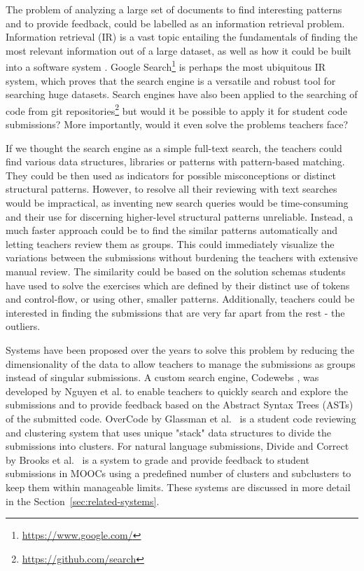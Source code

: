 The problem of analyzing a large set of documents to find interesting patterns and to provide feedback, could be labelled as an information retrieval problem. Information retrieval (IR) is a vast topic entailing the fundamentals of finding the most relevant information out of a large dataset, as well as how it could be built into a software system \cite{ir-in-practise, intro-to-ir}. Google Search\footnote{\url{https://www.google.com/}} is perhaps the most ubiquitous IR system, which proves that the search engine is a versatile and robust tool for searching huge datasets. Search engines have also been applied to the searching of code from git repositories\footnote{\url{https://github.com/search}} but would it be possible to apply it for student code submissions? More importantly, would it even solve the problems teachers face?

If we thought the search engine as a simple full-text search, the teachers could find various data structures, libraries or patterns with pattern-based matching. They could be then used as indicators for possible misconceptions or distinct structural patterns. However, to resolve all their reviewing with text searches would be impractical, as inventing new search queries would be time-consuming and their use for discerning higher-level structural patterns unreliable. Instead, a much faster approach could be to find the similar patterns automatically and letting teachers review them as groups. This could immediately visualize the variations between the submissions without burdening the teachers with extensive manual review. The similarity could be based on the solution schemas students have used to solve the exercises which are defined by their distinct use of tokens and control-flow, or using other, smaller patterns\cite{overcode}. Additionally, teachers could be interested in finding the submissions that are very far apart from the rest - the outliers.

Systems have been proposed over the years to solve this problem by reducing the dimensionality of the data to allow teachers to manage the submissions as groups instead of singular submissions. A custom search engine, Codewebs \cite{codewebs}, was developed by Nguyen et al. to enable teachers to quickly search and explore the submissions and to provide feedback based on the Abstract Syntax Trees (ASTs) of the submitted code. OverCode by Glassman et al.~\cite{overcode} is a student code reviewing and clustering system that uses unique "stack" data structures to divide the submissions into clusters. For natural language submissions, Divide and Correct by Brooks et al.~\cite{divide-and-correct} is a system to grade and provide feedback to student submissions in MOOCs using a predefined number of clusters and subclusters to keep them within manageable limits. These systems are discussed in more detail in the Section~\ref{sec:related-systems}.

